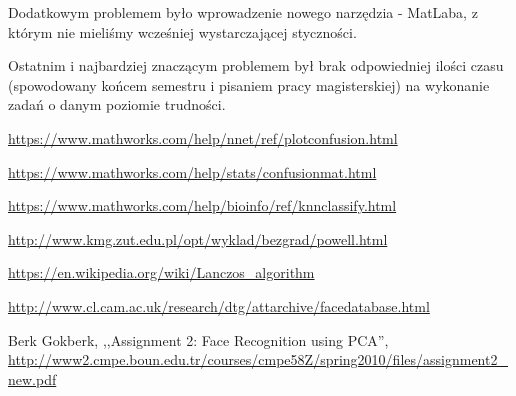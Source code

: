 \documentclass[11pt, a4paper]{article}
\newcommand{\fbi}{\leavevmode{\parindent=1em\indent}}
\begin{document}
\fbi
Dodatkowym problemem było wprowadzenie nowego narzędzia - MatLaba, z którym nie mieliśmy wcześniej wystarczającej styczności.

\fbi
Ostatnim i najbardziej znaczącym problemem był brak odpowiedniej ilości czasu (spowodowany końcem semestru i pisaniem pracy magisterskiej) na wykonanie zadań o danym poziomie trudności.

\newpage
\begin{thebibliography}{40}

\url{https://www.mathworks.com/help/nnet/ref/plotconfusion.html}

\url{https://www.mathworks.com/help/stats/confusionmat.html}

\url{https://www.mathworks.com/help/bioinfo/ref/knnclassify.html}

\url{http://www.kmg.zut.edu.pl/opt/wyklad/bezgrad/powell.html}

\url{https://en.wikipedia.org/wiki/Lanczos_algorithm}

\url{http://www.cl.cam.ac.uk/research/dtg/attarchive/facedatabase.html}

Berk Gokberk, ,,Assignment 2: Face Recognition using PCA'',
\url{http://www2.cmpe.boun.edu.tr/courses/cmpe58Z/spring2010/files/assignment2_new.pdf}


\end{thebibliography}
\end{document}
